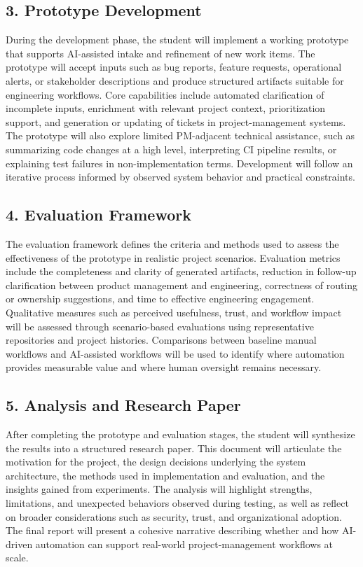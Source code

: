 \documentclass[11pt]{article}
\begin{document}
\subsection*{3. Prototype Development}

During the development phase, the student will implement a working prototype that supports AI-assisted intake and refinement of new work items. The prototype will accept inputs such as bug reports, feature requests, operational alerts, or stakeholder descriptions and produce structured artifacts suitable for engineering workflows. Core capabilities include automated clarification of incomplete inputs, enrichment with relevant project context, prioritization support, and generation or updating of tickets in project-management systems. The prototype will also explore limited PM-adjacent technical assistance, such as summarizing code changes at a high level, interpreting CI pipeline results, or explaining test failures in non-implementation terms. Development will follow an iterative process informed by observed system behavior and practical constraints.

\subsection*{4. Evaluation Framework}

The evaluation framework defines the criteria and methods used to assess the effectiveness of the prototype in realistic project scenarios. Evaluation metrics include the completeness and clarity of generated artifacts, reduction in follow-up clarification between product management and engineering, correctness of routing or ownership suggestions, and time to effective engineering engagement. Qualitative measures such as perceived usefulness, trust, and workflow impact will be assessed through scenario-based evaluations using representative repositories and project histories. Comparisons between baseline manual workflows and AI-assisted workflows will be used to identify where automation provides measurable value and where human oversight remains necessary.

\subsection*{5. Analysis and Research Paper}

After completing the prototype and evaluation stages, the student will synthesize the results into a structured research paper. This document will articulate the motivation for the project, the design decisions underlying the system architecture, the methods used in implementation and evaluation, and the insights gained from experiments. The analysis will highlight strengths, limitations, and unexpected behaviors observed during testing, as well as reflect on broader considerations such as security, trust, and organizational adoption. The final report will present a cohesive narrative describing whether and how AI-driven automation can support real-world project-management workflows at scale.
\end{document}
